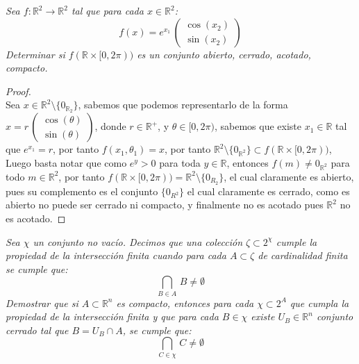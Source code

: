 \documentclass[11pt,letterpaper]{article}
\newcommand{\R}{\mathbb{R}}
\begin{document}
\begin{tcolorbox}[
  enhanced,
  colback=black,        %
  coltext=white,        %
  coltitle=black,       %
  colbacktitle=white,   %
  title={\textbf{Problema 1}},
   boxrule=2pt,          %
  colframe=white,  %
  arc=4pt,              %
  width=\linewidth
]
\textit{Sea $f:\R^2\rightarrow \R^2$ tal que para cada $x\in \R^2$:
\begin{equation*}
    f(x)=e^{x_1}\,\begin{pmatrix}
        \cos(x_2)\\
        \sin(x_2)
    \end{pmatrix}
\end{equation*}
Determinar si $f(\R\times [0,2\pi))$ es un conjunto abierto, cerrado, acotado, compacto.}
\end{tcolorbox}
\begin{proof}\,\\
  Sea $x\in \R^2\setminus \{0_{\R_2}\}$, sabemos que podemos representarlo de la forma $x=r\,\begin{pmatrix}
        \cos(\theta)\\
        \sin(\theta)
  \end{pmatrix}$, donde $r\in \R^+$, y $\theta\in [0,2\pi)$, sabemos que existe $x_1\in \R$ tal que $e^{x_1}=r$, por tanto $f(x_1,\theta_1)=x$, por tanto $\R^2\setminus \{0_{\R^2}\}\subset f(\R\times [0,2\pi))$, Luego
  basta notar que como $e^y>0$ para toda $y\in \R$, entonces $f(m)\neq 0_{\R^2}$ para todo $m\in\R^2$, por tanto $f(\R\times[0,2\pi))=\R^2\setminus\{0_{R_2}\}$, el cual claramente es abierto, pues su complemento es el conjunto $\{0_{R^2}\}$ el cual claramente es cerrado, como es abierto no puede ser cerrado ni compacto, y finalmente no es
  acotado pues $\R^2$ no es acotado.
\end{proof}
\begin{tcolorbox}[
  enhanced,
  colback=black,        %
  coltext=white,        %
  coltitle=black,       %
  colbacktitle=white,   %
  title={\textbf{Problema 2}},
   boxrule=2pt,          %
  colframe=white,  %
  arc=4pt,              %
  width=\linewidth
]
\textit{
Sea $\chi$ un conjunto no vacío. Decimos que una colección $\zeta\subset 2^{\chi}$ cumple la propiedad de la intersección finita cuando para cada $A\subset \zeta$ de cardinalidad finita se cumple que:
\begin{equation*}
    \bigcap_{B\in A}\,B \neq \emptyset
\end{equation*}
Demostrar que si $A\subset \mathbb{R}^n$ es compacto, entonces para cada $\chi\subset 2^A$ que cumpla la propiedad de la intersección finita y que para cada $B\in \chi$ existe $U_{B}\in \mathbb{R}^n$ conjunto cerrado tal que $B=U_{B}\cap A$, se cumple que:
\begin{equation*}
    \bigcap_{C\in\chi}\,C\neq \emptyset
\end{equation*}
}
\end{tcolorbox}
\end{document}

